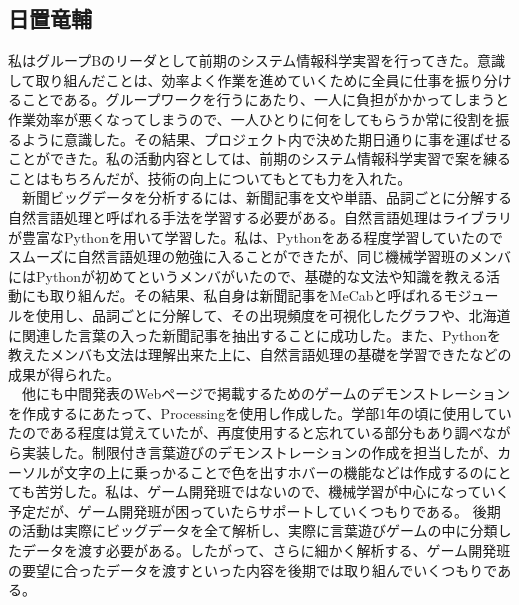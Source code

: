 \subsection{日置竜輔}
私はグループBのリーダとして前期のシステム情報科学実習を行ってきた。意識して取り組んだことは、効率よく作業を進めていくために全員に仕事を振り分けることである。グループワークを行うにあたり、一人に負担がかかってしまうと作業効率が悪くなってしまうので、一人ひとりに何をしてもらうか常に役割を振るように意識した。その結果、プロジェクト内で決めた期日通りに事を運ばせることができた。私の活動内容としては、前期のシステム情報科学実習で案を練ることはもちろんだが、技術の向上についてもとても力を入れた。\\
　新聞ビッグデータを分析するには、新聞記事を文や単語、品詞ごとに分解する自然言語処理と呼ばれる手法を学習する必要がある。自然言語処理はライブラリが豊富なPythonを用いて学習した。私は、Pythonをある程度学習していたのでスムーズに自然言語処理の勉強に入ることができたが、同じ機械学習班のメンバにはPythonが初めてというメンバがいたので、基礎的な文法や知識を教える活動にも取り組んだ。その結果、私自身は新聞記事をMeCabと呼ばれるモジュールを使用し、品詞ごとに分解して、その出現頻度を可視化したグラフや、北海道に関連した言葉の入った新聞記事を抽出することに成功した。また、Pythonを教えたメンバも文法は理解出来た上に、自然言語処理の基礎を学習できたなどの成果が得られた。\\
　他にも中間発表のWebページで掲載するためのゲームのデモンストレーションを作成するにあたって、Processingを使用し作成した。学部1年の頃に使用していたのである程度は覚えていたが、再度使用すると忘れている部分もあり調べながら実装した。制限付き言葉遊びのデモンストレーションの作成を担当したが、カーソルが文字の上に乗っかることで色を出すホバーの機能などは作成するのにとても苦労した。私は、ゲーム開発班ではないので、機械学習が中心になっていく予定だが、ゲーム開発班が困っていたらサポートしていくつもりである。
後期の活動は実際にビッグデータを全て解析し、実際に言葉遊びゲームの中に分類したデータを渡す必要がある。したがって、さらに細かく解析する、ゲーム開発班の要望に合ったデータを渡すといった内容を後期では取り組んでいくつもりである。

